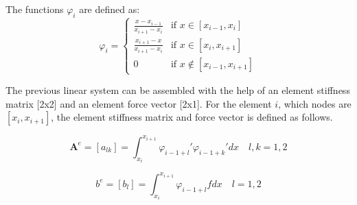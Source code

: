 \documentclass{article}
\begin{document}
\noindent The functions $\varphi_i$ are defined as:
\[\varphi_i= \left\{
\begin{array}{rcl}
\frac{x-x_{i-1}}{x_{i+1}-x_{i}}& \text{if } x\in [x_{i-1}, x_i]\\
\frac{x_{i+1}-x}{x_{i+1}-x_{i}}& \text{if } x\in [x_{i}, x_{i+1}]\\
0& \text{if } x\notin [x_{i-1}, x_{i+1}]
\end{array}\right.\]

\noindent The previous linear system can be assembled with the help of an element stiffness matrix [2x2] and an element force vector [2x1]. For the element $i$, which nodes are $[x_i,x_{i+1}]$, the element stiffness matrix and force vector is defined as follows.

\begin{equation*}
    \textbf{A}^e=[a_{lk}]=\int_{x_i}^{x_{i+1}} \varphi_{i-1+l}' \varphi_{i-1+k}' dx \quad
     l,k=1,2  
\end{equation*}

\begin{equation*}
    b^e=[b_{l}]=\int_{x_i}^{x_{i+1}} \varphi_{i-1+l} f dx \quad
     l=1,2  
\end{equation*}
\end{document}
